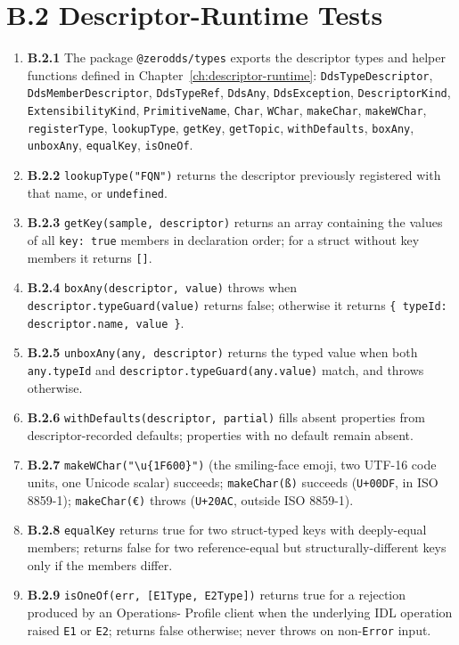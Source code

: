 \documentclass{../styles/zerodds-vendor-spec}
\begin{document}
\section*{B.2 Descriptor-Runtime Tests}

\begin{enumerate}
  \item \textbf{B.2.1} The package \texttt{@zerodds/types} exports
        the descriptor types and helper functions defined in
        Chapter~\ref{ch:descriptor-runtime}:
        \texttt{DdsTypeDescriptor}, \texttt{DdsMemberDescriptor},
        \texttt{DdsTypeRef}, \texttt{DdsAny},
        \texttt{DdsException}, \texttt{DescriptorKind},
        \texttt{ExtensibilityKind}, \texttt{PrimitiveName},
        \texttt{Char}, \texttt{WChar}, \texttt{makeChar},
        \texttt{makeWChar}, \texttt{registerType},
        \texttt{lookupType}, \texttt{getKey}, \texttt{getTopic},
        \texttt{withDefaults}, \texttt{boxAny},
        \texttt{unboxAny}, \texttt{equalKey}, \texttt{isOneOf}.
  \item \textbf{B.2.2} \texttt{lookupType("FQN")} returns the
        descriptor previously registered with that name, or
        \texttt{undefined}.
  \item \textbf{B.2.3} \texttt{getKey(sample, descriptor)}
        returns an array containing the values of all
        \texttt{key:\,true} members in declaration order; for a
        struct without key members it returns \texttt{[]}.
  \item \textbf{B.2.4} \texttt{boxAny(descriptor, value)} throws
        when \texttt{descriptor.typeGuard(value)} returns false;
        otherwise it returns
        \texttt{\{ typeId:\,descriptor.name, value\,\}}.
  \item \textbf{B.2.5} \texttt{unboxAny(any, descriptor)} returns
        the typed value when both \texttt{any.typeId} and
        \texttt{descriptor.typeGuard(any.value)} match, and
        throws otherwise.
  \item \textbf{B.2.6} \texttt{withDefaults(descriptor,\,partial)}
        fills absent properties from descriptor-recorded
        defaults; properties with no default remain absent.
  \item \textbf{B.2.7} \texttt{makeWChar("\textbackslash u\{1F600\}")}
        (the smiling-face emoji, two UTF-16 code units, one Unicode
        scalar) succeeds; \texttt{makeChar(\textquotedbl{}ß\textquotedbl{})}
        succeeds (\texttt{U+00DF}, in ISO 8859-1);
        \texttt{makeChar(\textquotedbl{}€\textquotedbl{})} throws
        (\texttt{U+20AC}, outside ISO 8859-1).
  \item \textbf{B.2.8} \texttt{equalKey} returns true for two
        struct-typed keys with deeply-equal members; returns false
        for two reference-equal but structurally-different keys
        only if the members differ.
  \item \textbf{B.2.9} \texttt{isOneOf(err, [E1Type, E2Type])}
        returns true for a rejection produced by an Operations-
        Profile client when the underlying IDL operation raised
        \texttt{E1} or \texttt{E2}; returns false otherwise; never
        throws on non-\texttt{Error} input.
\end{enumerate}
\end{document}
